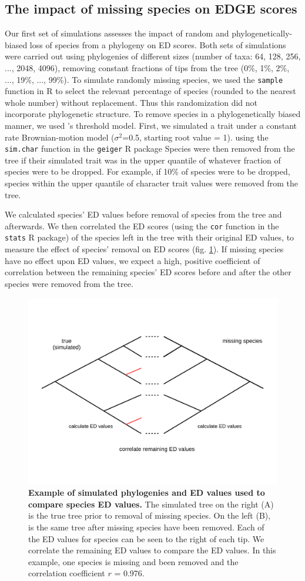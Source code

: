 \documentclass[12pt,english]{article}
\begin{document}
\subsection*{The impact of missing species on EDGE scores}
Our first set of simulations assesses the impact of random and
phylogenetically-biased loss of species from a phylogeny on ED scores. Both sets
of simulations were carried out using phylogenies of different sizes (number of
taxa: 64, 128, 256, ..., 2048, 4096), removing constant fractions of tips from
the tree (0\%, 1\%, 2\%, ..., 19\%, ..., 99\%). To simulate randomly missing
species, we used the \texttt{sample} function in R to select the relevant
percentage of species (rounded to the nearest whole number) without replacement.
Thus this randomization did not incorporate phylogenetic structure. To remove
species in a phylogenetically biased manner, we used
\textcite{Felsenstein2005}'s threshold model. First, we simulated a trait under
a constant rate Brownian-motion model ($\sigma^2$=0.5, starting root value = 1).
using the \texttt{sim.char} function in the \texttt{geiger} R package
\autocite{Pennell2014} Species were then removed from the tree if their
simulated trait was in the upper quantile of whatever fraction of species were
to be dropped. For example, if 10\% of species were to be dropped, species
within the upper  quantile of character trait values were removed from
the tree. 

We calculated species' ED values before removal of species from the tree and
afterwards. We then correlated the ED scores (using the \texttt{cor} function in
the \texttt{stats} R package) of the species left in the tree with their
original ED values, to measure the effect of species' removal on ED scores (fig.
\ref{missingSpecies}). If missing species have no effect upon ED values, we
expect a high, positive coefficient of correlation between the remaining
species' ED scores before and after the other species were removed from the
tree.

\begin{figure}[!ht]
  \center
  \includegraphics[width=.5\textwidth]{missingSpecies.png}
  \caption{\textbf{Example of simulated phylogenies and ED values used to
  compare species ED values.} The simulated tree on the right (A) is the true
  tree prior to removal of missing species. On the left (B), is the same tree
  after missing species have been removed. Each of the ED values for species can
  be seen to the right of each tip. We correlate the remaining ED values to
  compare the ED values. In this example, one species is missing and been
  removed and the correlation coefficient $r$ = 0.976.}
  \label{missingSpecies}
\end{figure}
\end{document}
